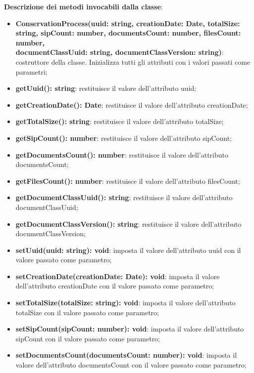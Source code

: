 \documentclass[a4paper,12pt]{article}
\begin{document}
{{{              \noindent \textbf{Descrizione dei metodi invocabili dalla classe}:
                \begin{itemize}
                    \item \textbf{ConservationProcess(uuid: string, creationDate: Date, totalSize: string, sipCount: number, documentsCount: number, filesCount: number,\\ documentClassUuid: string, documentClassVersion: string)}: costruttore della classe. Inizializza tutti gli attributi con i valori passati come parametri;
                    \item \textbf{getUuid(): string}: restituisce il valore dell'attributo uuid;
                    \item \textbf{getCreationDate(): Date}: restituisce il valore dell'attributo creationDate;
                    \item \textbf{getTotalSize(): string}: restituisce il valore dell'attributo totalSize;
                    \item \textbf{getSipCount(): number}: restituisce il valore dell'attributo sipCount;
                    \item \textbf{getDocumentsCount(): number}: restituisce il valore dell'attributo documentsCount;
                    \item \textbf{getFilesCount(): number}: restituisce il valore dell'attributo filesCount;
                    \item \textbf{getDocumentClassUuid(): string}: restituisce il valore dell'attributo documentClassUuid;
                    \item \textbf{getDocumentClassVersion(): string}: restituisce il valore dell'attributo documentClassVersion;
                    \item \textbf{setUuid(uuid: string): void}: imposta il valore dell'attributo uuid con il valore passato come parametro;
                    \item \textbf{setCreationDate(creationDate: Date): void}: imposta il valore dell'attributo creationDate con il valore passato come parametro;
                    \item \textbf{setTotalSize(totalSize: string): void}: imposta il valore dell'attributo totalSize con il valore passato come parametro;
                    \item \textbf{setSipCount(sipCount: number): void}: imposta il valore dell'attributo sipCount con il valore passato come parametro;
                    \item \textbf{setDocumentsCount(documentsCount: number): void}: imposta il valore dell'attributo documentsCount con il valore passato come parametro;

\end{itemize}}}}
\end{document}
